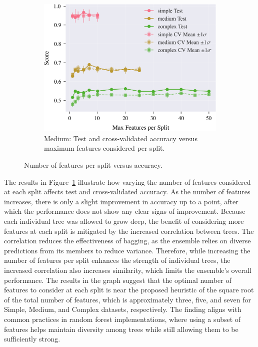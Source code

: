\documentclass[conference]{IEEEtran}
\begin{document}
\begin{figure}[H]
  \centering
  \begin{subfigure}[b]{\columnwidth}
    \centering
    \includegraphics[width=\linewidth]{images/all_datasets_accuracy_vs_features.png}
  \caption{Medium: Test and cross-validated accuracy versus maximum features considered per split.}
    \label{fig:exp2-medium-acc}
  \end{subfigure}
  \caption{Number of features per split versus accuracy.}
  \label{fig:exp2-accuracy-features}
\end{figure}

The results in Figure~\ref{fig:exp2-medium-acc} illustrate how varying the number of features considered at each split affects test and cross-validated accuracy. As the number of features increases, there is only a slight improvement in accuracy up to a point, after which the performance does not show any clear signs of improvement. Because each individual tree was allowed to grow deep, the benefit of considering more features at each split is mitigated by the increased correlation between trees. The correlation reduces the effectiveness of bagging, as the ensemble relies on diverse predictions from its members to reduce variance. Therefore, while increasing the number of features per split enhances the strength of individual trees, the increased correlation also increases similarity, which limits the ensemble's overall performance. The results in the graph suggest that the optimal number of features to consider at each split is near the proposed heuristic of the square root of the total number of features, which is approximately three, five, and seven for Simple, Medium, and Complex datasets, respectively. The finding aligns with common practices in random forest implementations, where using a subset of features helps maintain diversity among trees while still allowing them to be sufficiently strong.
\end{document}
